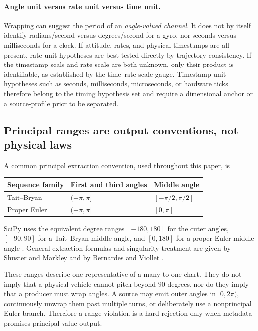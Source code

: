 \documentclass[11pt]{article}
\begin{document}
    \paragraph{Angle unit versus rate unit versus time unit.}
    Wrapping can suggest the period of an \emph{angle-valued channel}. It does not by itself
    identify radians/second versus degrees/second for a gyro, nor seconds versus milliseconds
    for a clock. If attitude, rates, and physical timestamps are all present, rate-unit
    hypotheses are best tested directly by trajectory consistency. If the timestamp scale
    and rate scale are both unknown, only their product is identifiable, as established by the time--rate scale gauge.
    Timestamp-unit hypotheses such as seconds, milliseconds, microseconds, or hardware ticks
    therefore belong to the timing hypothesis set and require a dimensional anchor or a
    source-profile prior to be separated.

    \subsection{Principal ranges are output conventions, not physical laws}

    A common principal extraction convention, used throughout this paper, is
    \begin{center}
        \begin{tabular}{@{}lll@{}}
            \toprule
            Sequence family & First and third angles & Middle angle     \\
            \midrule
            Tait--Bryan     & $(-\pi,\pi]$           & $[-\pi/2,\pi/2]$ \\
            Proper Euler    & $(-\pi,\pi]$           & $[0,\pi]$        \\
            \bottomrule
        \end{tabular}
    \end{center}
    SciPy uses the equivalent degree ranges $[-180,180]$ for the outer angles,
    $[-90,90]$ for a Tait--Bryan middle angle, and $[0,180]$ for a proper-Euler middle
    angle \cite{scipyEulerRanges}. General extraction formulas and singularity treatment are
    given by Shuster and Markley and by Bernardes and Viollet
    \cite{shusterMarkley2006,bernardes2022}.

    These ranges describe one representative of a many-to-one chart. They do not imply that
    a physical vehicle cannot pitch beyond $90$ degrees, nor do they imply that a producer
    must wrap angles. A source may emit outer angles in $[0,2\pi)$, continuously unwrap them
    past multiple turns, or deliberately use a nonprincipal Euler branch. Therefore a range
    violation is a hard rejection only when metadata promises principal-value output.
\end{document}
